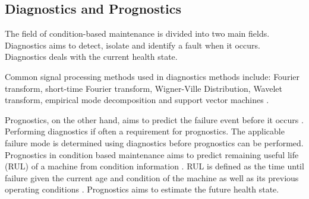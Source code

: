 






\subsection{Diagnostics and Prognostics}

The field of condition-based maintenance is divided into two main fields. Diagnostics aims to detect, isolate and identify a fault when it occurs. Diagnostics deals with the current health state. 

Common signal processing methods used in diagnostics methods include: Fourier transform, short-time Fourier transform, Wigner-Ville Distribution, Wavelet transform, empirical mode decomposition and support vector machines \cite{Salameh2018}. 

Prognostics, on the other hand, aims to predict the failure event before it occurs \citep{Jardine2006}. Performing diagnostics if often a requirement for prognostics. The applicable failure mode is determined using diagnostics before prognostics can be performed. Prognostics in condition based maintenance aims to predict remaining useful life (RUL) of a machine from condition information \citep{Lei2018}. RUL is defined as the time until failure given the current age and condition of the machine as well as its previous operating conditions \citep{Jardine2006}. Prognostics aims to estimate the future health state.


